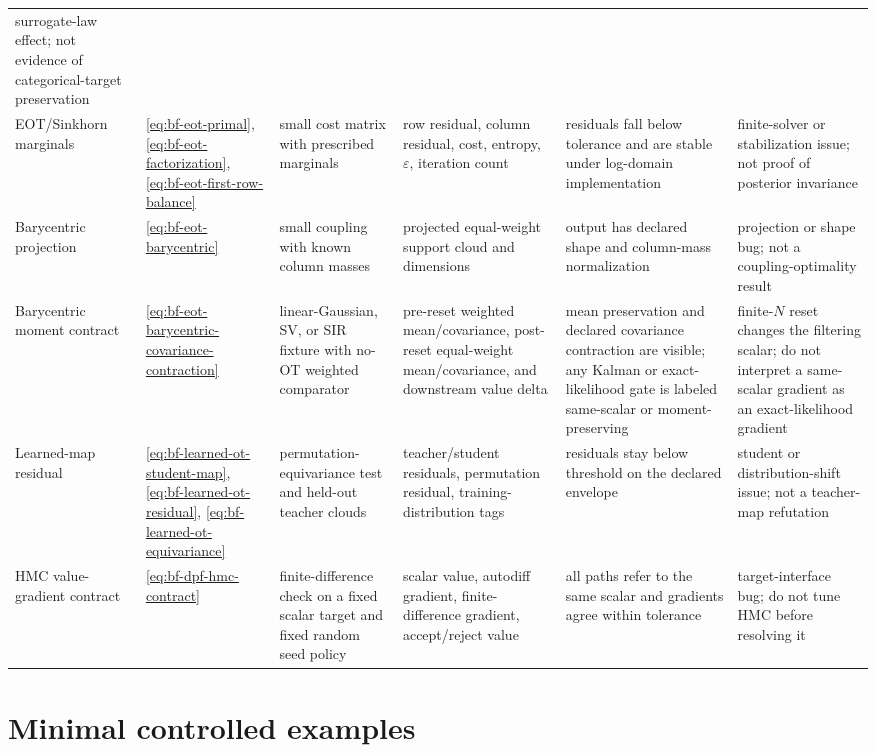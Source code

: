 \begin{center}
\begin{longtable}{@{}p{} p{} p{} p{} p{} p{}@{}}
surrogate-law effect; not evidence of categorical-target preservation \\
EOT/Sinkhorn marginals &
\eqref{eq:bf-eot-primal}, \eqref{eq:bf-eot-factorization}, \eqref{eq:bf-eot-first-row-balance} &
small cost matrix with prescribed marginals &
row residual, column residual, cost, entropy, $\varepsilon$, iteration count &
residuals fall below tolerance and are stable under log-domain implementation &
finite-solver or stabilization issue; not proof of posterior invariance \\
Barycentric projection &
\eqref{eq:bf-eot-barycentric} &
small coupling with known column masses &
projected equal-weight support cloud and dimensions &
output has declared shape and column-mass normalization &
projection or shape bug; not a coupling-optimality result \\
Barycentric moment contract &
\eqref{eq:bf-eot-barycentric-covariance-contraction} &
linear-Gaussian, SV, or SIR fixture with no-OT weighted comparator &
pre-reset weighted mean/covariance, post-reset equal-weight mean/covariance, and downstream value delta &
mean preservation and declared covariance contraction are visible; any Kalman or exact-likelihood gate is labeled same-scalar or moment-preserving &
finite-\(N\) reset changes the filtering scalar; do not interpret a same-scalar gradient as an exact-likelihood gradient \\
Learned-map residual &
\eqref{eq:bf-learned-ot-student-map}, \eqref{eq:bf-learned-ot-residual}, \eqref{eq:bf-learned-ot-equivariance} &
permutation-equivariance test and held-out teacher clouds &
teacher/student residuals, permutation residual, training-distribution tags &
residuals stay below threshold on the declared envelope &
student or distribution-shift issue; not a teacher-map refutation \\
HMC value-gradient contract &
\eqref{eq:bf-dpf-hmc-contract} &
finite-difference check on a fixed scalar target and fixed random seed policy &
scalar value, autodiff gradient, finite-difference gradient, accept/reject value &
all paths refer to the same scalar and gradients agree within tolerance &
target-interface bug; do not tune HMC before resolving it \\
\end{longtable}
\end{center}

\section{Minimal controlled examples}
\label{sec:bf-dpf-debug-controlled-examples}

